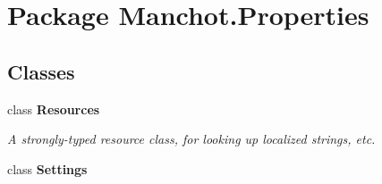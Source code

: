 \hypertarget{namespace_manchot_1_1_properties}{\section{Package Manchot.\+Properties}
\label{namespace_manchot_1_1_properties}
}
\subsection*{Classes}
\begin{DoxyCompactItemize}
\item 
class {\bfseries Resources}
\begin{DoxyCompactList}\small\item\em A strongly-\/typed resource class, for looking up localized strings, etc. \end{DoxyCompactList}\item 
class {\bfseries Settings}
\end{DoxyCompactItemize}
